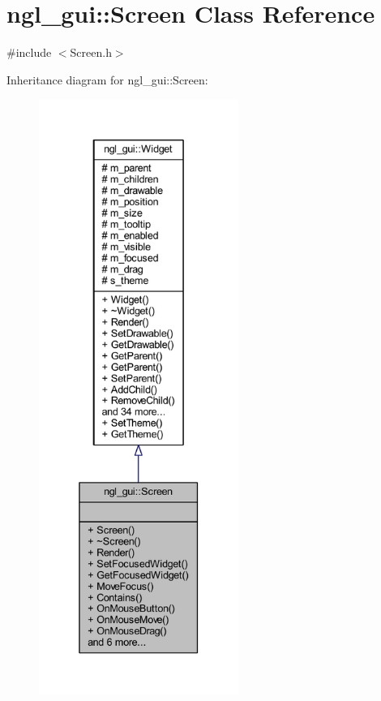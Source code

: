 \hypertarget{classngl__gui_1_1_screen}{}\section{ngl\+\_\+gui\+:\+:Screen Class Reference}
\label{classngl__gui_1_1_screen}


{\ttfamily \#include $<$Screen.\+h$>$}



Inheritance diagram for ngl\+\_\+gui\+:\+:Screen\+:\nopagebreak
\begin{figure}[H]
\begin{center}
\leavevmode
\includegraphics[height=550pt]{classngl__gui_1_1_screen__inherit__graph}
\end{center}
\end{figure}



